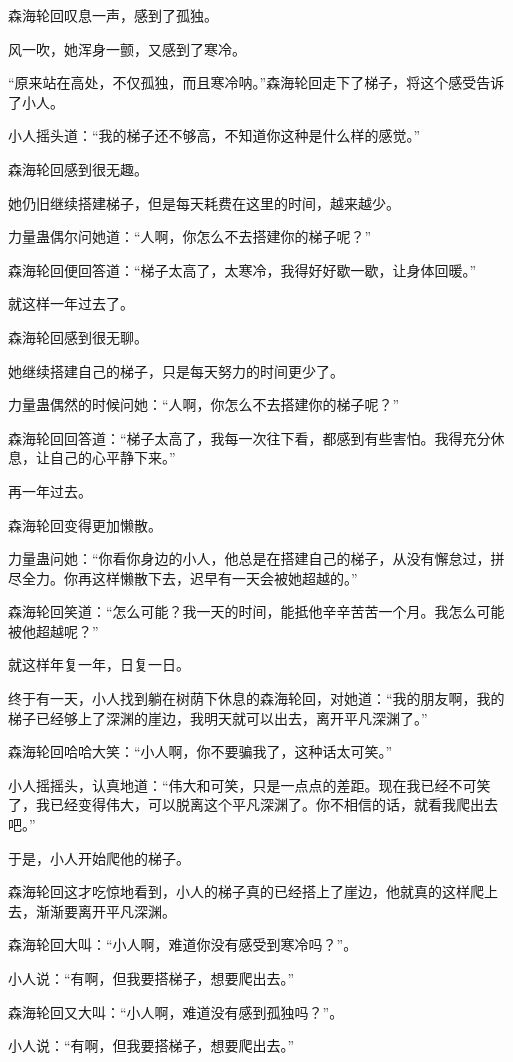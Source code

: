 \begin{this_body}
森海轮回叹息一声，感到了孤独。

风一吹，她浑身一颤，又感到了寒冷。

“原来站在高处，不仅孤独，而且寒冷呐。”森海轮回走下了梯子，将这个感受告诉了小人。

小人摇头道：“我的梯子还不够高，不知道你这种是什么样的感觉。”

森海轮回感到很无趣。

她仍旧继续搭建梯子，但是每天耗费在这里的时间，越来越少。

力量蛊偶尔问她道：“人啊，你怎么不去搭建你的梯子呢？”

森海轮回便回答道：“梯子太高了，太寒冷，我得好好歇一歇，让身体回暖。”

就这样一年过去了。

森海轮回感到很无聊。

她继续搭建自己的梯子，只是每天努力的时间更少了。

力量蛊偶然的时候问她：“人啊，你怎么不去搭建你的梯子呢？”

森海轮回回答道：“梯子太高了，我每一次往下看，都感到有些害怕。我得充分休息，让自己的心平静下来。”

再一年过去。

森海轮回变得更加懒散。

力量蛊问她：“你看你身边的小人，他总是在搭建自己的梯子，从没有懈怠过，拼尽全力。你再这样懒散下去，迟早有一天会被她超越的。”

森海轮回笑道：“怎么可能？我一天的时间，能抵他辛辛苦苦一个月。我怎么可能被他超越呢？”

就这样年复一年，日复一日。

终于有一天，小人找到躺在树荫下休息的森海轮回，对她道：“我的朋友啊，我的梯子已经够上了深渊的崖边，我明天就可以出去，离开平凡深渊了。”

森海轮回哈哈大笑：“小人啊，你不要骗我了，这种话太可笑。”

小人摇摇头，认真地道：“伟大和可笑，只是一点点的差距。现在我已经不可笑了，我已经变得伟大，可以脱离这个平凡深渊了。你不相信的话，就看我爬出去吧。”

于是，小人开始爬他的梯子。

森海轮回这才吃惊地看到，小人的梯子真的已经搭上了崖边，他就真的这样爬上去，渐渐要离开平凡深渊。

森海轮回大叫：“小人啊，难道你没有感受到寒冷吗？”。

小人说：“有啊，但我要搭梯子，想要爬出去。”

森海轮回又大叫：“小人啊，难道没有感到孤独吗？”。

小人说：“有啊，但我要搭梯子，想要爬出去。”


\end{this_body}
